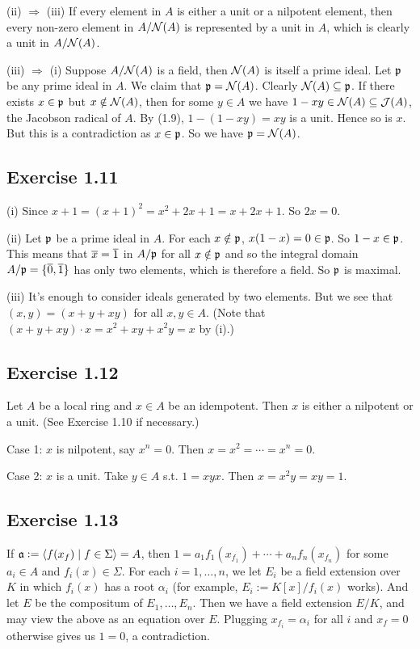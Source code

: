 \documentclass[../A&M.tex]{subfiles}
\begin{document}
(ii) $\Rightarrow$ (iii) If every element in $A$ is either a unit or a nilpotent element, then every non-zero element in $A/\mathcal{N}(A)$ is represented by a unit in $A$, which is clearly a unit in $A/\mathcal{N}(A)$.

(iii) $\Rightarrow$ (i) Suppose $A/\mathcal{N}(A)$ is a field, then $\mathcal{N}(A)$ is itself a prime ideal. Let $\mathfrak{p}$ be any prime ideal in $A$. We claim that $\mathfrak{p}=\mathcal{N}(A)$. Clearly $\mathcal{N}(A) \subseteq \mathfrak{p}$. If there exists $x\in\mathfrak{p}$ but $x\notin\mathcal{N}(A)$, then for some $y\in A$ we have $1-xy\in\mathcal{N}(A) \subseteq \mathcal{J}(A)$, the Jacobson radical of $A$. By (1.9), $1-(1-xy) = xy$ is a unit. Hence so is $x$. But this is a contradiction as $x\in\mathfrak{p}$. So we have $\mathfrak{p}=\mathcal{N}(A)$.

\subsection*{Exercise 1.11}

(i) Since $x+1 = (x+1)^2 = x^2 + 2x + 1 = x + 2x + 1$. So $2x=0$.

(ii) Let $\mathfrak{p}$ be a prime ideal in $A$. For each $x\notin\mathfrak{p}$, $x(1-x)=0\in\mathfrak{p}$. So $1-x\in\mathfrak{p}$. This means that $\overline{x}=\overline{1}$ in $A/\mathfrak{p}$ for all $x\notin\mathfrak{p}$ and so the integral domain $A/\mathfrak{p} = \{\overline{0},\overline{1}\}$ has only two elements, which is therefore a field. So $\mathfrak{p}$ is maximal.

(iii) It's enough to consider ideals generated by two elements. But we see that $(x,y)=(x+y+xy)$ for all $x,y\in A$. (Note that $(x+y+xy)\cdot x = x^2+xy+x^2y = x$ by (i).)

\subsection*{Exercise 1.12}

Let $A$ be a local ring and $x\in A$ be an idempotent. Then $x$ is either a nilpotent or a unit. (See Exercise 1.10 if necessary.)

Case 1: $x$ is nilpotent, say $x^n=0$. Then $x=x^2=\cdots=x^n=0$.

Case 2: $x$ is a unit. Take $y\in A$ s.t. $1=xyx$. Then $x=x^2y=xy=1$.

\subsection*{Exercise 1.13}

If $\mathfrak{a}:=\langle f(x_f) \mid f\in\Sigma \rangle = A$, then $1=a_1f_1(x_{f_1})+\cdots+a_nf_n(x_{f_n})$ for some $a_i\in A$ and $f_i(x)\in\Sigma$. For each $i=1,\ldots,n$, we let $E_i$ be a field extension over $K$ in which $f_i(x)$ has a root $\alpha_i$ (for example, $E_i:=K[x]/f_i(x)$ works). And let $E$ be the compositum of $E_1,\ldots,E_n$. Then we have a field extension $E/K$, and may view the above as an equation over $E$. Plugging $x_{f_i} = \alpha_i$ for all $i$ and $x_f=0$ otherwise gives us $1=0$, a contradiction.
\end{document}
